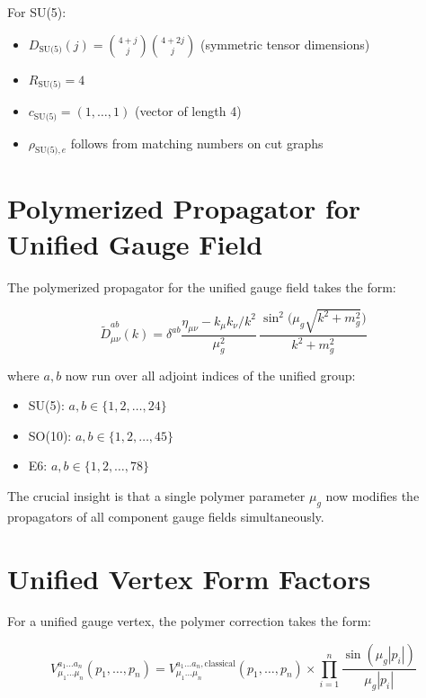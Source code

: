 \documentclass[11pt]{article}
\begin{document}
For SU(5):
\begin{itemize}
    \item $D_{\text{SU(5)}}(j) = \binom{4+j}{j}\binom{4+2j}{j}$ (symmetric tensor dimensions)
    \item $R_{\text{SU(5)}} = 4$
    \item $c_{\text{SU(5)}} = (1,\ldots,1)$ (vector of length 4)
    \item $\rho_{\text{SU(5)},e}$ follows from matching numbers on cut graphs
\end{itemize}

\section{Polymerized Propagator for Unified Gauge Field}

The polymerized propagator for the unified gauge field takes the form:

\begin{equation}
  \boxed{
  \tilde{D}^{ab}_{\mu\nu}(k) = \delta^{ab}\frac{\eta_{\mu\nu}-k_\mu k_\nu/k^2}{\mu_g^2}\, \frac{\sin^2\!\bigl(\mu_g\sqrt{k^2+m_g^2}\bigr)}{k^2+m_g^2}
  }
\end{equation}

where $a,b$ now run over all adjoint indices of the unified group:
\begin{itemize}
    \item SU(5): $a,b \in \{1,2,\ldots,24\}$
    \item SO(10): $a,b \in \{1,2,\ldots,45\}$
    \item E6: $a,b \in \{1,2,\ldots,78\}$
\end{itemize}

The crucial insight is that a single polymer parameter $\mu_g$ now modifies the propagators of all component gauge fields simultaneously.

\section{Unified Vertex Form Factors}

For a unified gauge vertex, the polymer correction takes the form:

\begin{equation}
  \boxed{
  V^{a_1\ldots a_n}_{\mu_1\ldots\mu_n}(p_1,\ldots,p_n) = V^{a_1\ldots a_n,\text{classical}}_{\mu_1\ldots\mu_n}(p_1,\ldots,p_n) \times \prod_{i=1}^{n} \frac{\sin(\mu_g |p_i|)}{\mu_g |p_i|}
  }
\end{equation}
\end{document}
